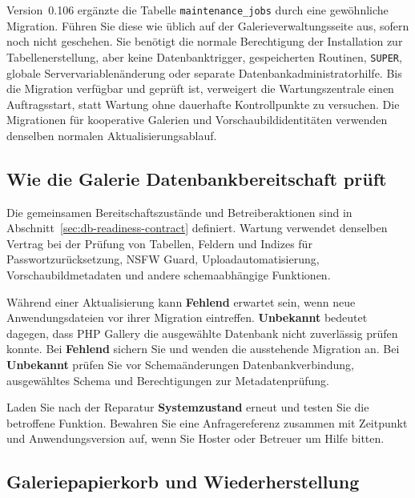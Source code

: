\documentclass[11pt,a4paper]{article}
\newcommand{\ui}[1]{\textbf{#1}}
\newcommand{\codeword}[1]{\nolinkurl{#1}}
\begin{document}
Version~0.106 ergänzte die Tabelle \codeword{maintenance\_jobs} durch eine
gewöhnliche Migration. Führen Sie diese wie üblich auf der
Galerieverwaltungsseite aus, sofern noch nicht geschehen. Sie benötigt die
normale Berechtigung der Installation zur Tabellenerstellung, aber keine
Datenbanktrigger, gespeicherten Routinen, \codeword{SUPER}, globale
Servervariablenänderung oder separate Datenbankadministratorhilfe. Bis die
Migration verfügbar und geprüft ist, verweigert die Wartungszentrale einen
Auftragsstart, statt Wartung ohne dauerhafte Kontrollpunkte zu versuchen. Die
Migrationen für kooperative Galerien und Vorschaubildidentitäten verwenden
denselben normalen Aktualisierungsablauf.

\subsection{Wie die Galerie Datenbankbereitschaft prüft}

Die gemeinsamen Bereitschaftszustände und Betreiberaktionen sind in
Abschnitt~\ref{sec:db-readiness-contract} definiert. Wartung verwendet denselben
Vertrag bei der Prüfung von Tabellen, Feldern und Indizes für
Passwortzurücksetzung, NSFW Guard, Uploadautomatisierung, Vorschaubildmetadaten
und andere schemaabhängige Funktionen.

Während einer Aktualisierung kann \ui{Fehlend} erwartet sein, wenn neue
Anwendungsdateien vor ihrer Migration eintreffen. \ui{Unbekannt} bedeutet
dagegen, dass PHP Gallery die ausgewählte Datenbank nicht zuverlässig prüfen
konnte. Bei \ui{Fehlend} sichern Sie und wenden die ausstehende Migration an.
Bei \ui{Unbekannt} prüfen Sie vor Schemaänderungen Datenbankverbindung,
ausgewähltes Schema und Berechtigungen zur Metadatenprüfung.

Laden Sie nach der Reparatur \ui{Systemzustand} erneut und testen Sie die
betroffene Funktion. Bewahren Sie eine Anfragereferenz zusammen mit Zeitpunkt
und Anwendungsversion auf, wenn Sie Hoster oder Betreuer um Hilfe bitten.

\subsection{Galeriepapierkorb und Wiederherstellung}
\end{document}
